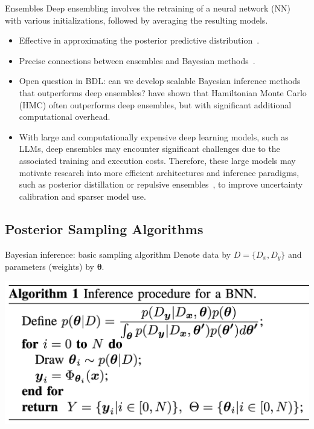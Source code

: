 \documentclass[9pt]{beamer}
\begin{document}
\begin{frame}{Ensembles}
\alert{Deep ensembling} involves the \alert{retraining} of a neural network (NN) with \alert{various initializations}, followed by \alert{averaging} the resulting models. 
\begin{itemize}[<+->]
	\item Effective in approximating the posterior predictive distribution~\citep{wilson2020bayesian}. 
	\item Precise connections between ensembles and Bayesian methods~\citep{ciosek2020conservative, he2020,wild2023a}.
	\item Open question in BDL: can we develop scalable Bayesian inference methods that outperforms deep ensembles? \citet{izmailov2021} have shown that \alert{Hamiltonian Monte Carlo (HMC)} often outperforms deep ensembles, but with significant additional \alert{computational overhead}.
	\item With large and computationally expensive deep learning models, such as LLMs, deep ensembles may encounter significant challenges due to the associated \alert{training and execution costs}. Therefore, these large models may motivate research into more efficient architectures and inference paradigms, such as \alert{posterior distillation} or \alert{repulsive ensembles}~\citep{dangelo2021repulsive}, to improve uncertainty calibration and sparser model use.
\end{itemize}
\end{frame}

\subsection{Posterior Sampling Algorithms}

\begin{frame}{Bayesian inference: basic sampling algorithm}
Denote data by $D=\{D_x,D_y\}$ and parameters (weights) by $\boldsymbol{\theta}$.
\begin{center}
	\includegraphics[width=.8\textwidth]{figures_julyan/bdl/hands-on/algo1}
\end{center}
\end{frame}
\end{document}
